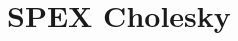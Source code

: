 \documentclass[12pt,oneside]{book}
\theoremstyle{definition}
\begin{document}
\begin{comment}
\end{itemize}

After all usage of the SPEX routines is finished, \verb|SPEX_finalize()|
must be called (Section \ref{ss:SPEX_finalize}) to finalize usage of the
library.


\cprotect\subsection{Examples}
\label{s:Using:Examples}
The \verb|SPEX/SPEX/SPEX_Left_LU/Demo| folder contains three sample C codes
which utilize SPEX. These files demonstrate the usage of SPEX as
follows:

{\bf FIXME: this is out of date}

\begin{itemize}
\item \verb|example.c|: This example generates a random dense $50 \times 50$
matrix and a random dense $50 \times 1$ right hand side vector $b$ and
solves the linear system. In this function, the \verb|SPEX_Left_LU_backslash|
function is used; and the output is given as a double matrix.

\item \verb|example2.c|: This example reads in a matrix stored in triplet
format from the \verb|ExampleMats| folder. Additionally, it reads in a
right hand side vector from this folder and solves the associated linear system
via the \verb|SPEX_Left_LU_backslash| function, and, the solution is given as a matrix
of rational numbers.

\item \verb|spexlu_demo.c|: This example reads in a matrix and right hand side
vector from a file and solves the linear system $A x = b$
using the techniques discussed in Section \ref{s:Using:expert}. This file also
allows command line arguments (discussed in \verb|README.md|) and can be used
to replicate the results from \cite{lourenco2019exact}.

\end{itemize}
\end{comment}


\chapter{SPEX Cholesky}\vspace{-0.75in} \label{ch:Chol}
\end{document}

